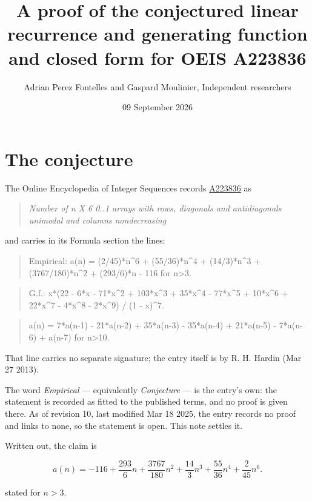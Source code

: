 \documentclass[11pt]{article}
\title{A proof of the conjectured linear recurrence and generating function and closed form for OEIS A223836}
\author{Adrian Perez Fontelles and Gaspard Moulinier, Independent researchers}
\date{09 September 2026}
\theoremstyle{definition}
\begin{document}
\maketitle
\section{The conjecture}

The Online Encyclopedia of Integer Sequences records \href{https://oeis.org/A223836}{A223836} as

\begin{quote}\itshape Number of n X 6 0..1 arrays with rows, diagonals and antidiagonals unimodal and columns nondecreasing\end{quote}

and carries in its Formula section the lines:

\begin{quote}\ttfamily Empirical: a(n) = (2/45)*n\textasciicircum{}6 + (55/36)*n\textasciicircum{}4 + (14/3)*n\textasciicircum{}3 + (3767/180)*n\textasciicircum{}2 + (293/6)*n - 116 for n>3.\end{quote}

\begin{quote}\ttfamily G.f.: x*(22 - 6*x - 71*x\textasciicircum{}2 + 103*x\textasciicircum{}3 + 35*x\textasciicircum{}4 - 77*x\textasciicircum{}5 + 10*x\textasciicircum{}6 + 22*x\textasciicircum{}7 - 4*x\textasciicircum{}8 - 2*x\textasciicircum{}9) / (1 - x)\textasciicircum{}7.\end{quote}

\begin{quote}\ttfamily a(n) = 7*a(n-1) - 21*a(n-2) + 35*a(n-3) - 35*a(n-4) + 21*a(n-5) - 7*a(n-6) + a(n-7) for n>10.\end{quote}

That line carries no separate signature; the entry itself is by R. H. Hardin (Mar 27 2013).

The word {\itshape Empirical} --- equivalently {\itshape Conjecture} --- is the entry's own: the statement is recorded as fitted to the published terms, and no proof is given there. As of revision 10, last modified Mar 18 2025, the entry records no proof and links to none, so the statement is open. This note settles it.

Written out, the claim is

\[a(n) = -116 + \frac{293}{6}n + \frac{3767}{180}n^{2} + \frac{14}{3}n^{3} + \frac{55}{36}n^{4} + \frac{2}{45}n^{6}.\]

stated for $n > 3$.
\end{document}
